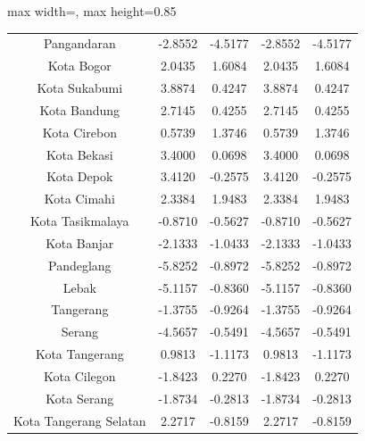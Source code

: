 \begin{table}[H]
\begin{adjustbox}{max width=\textwidth, max height=0.85\textheight}
\begin{tabular}{|c|c|c|c|c|}
Pangandaran & -2.8552 & -4.5177 & -2.8552 & -4.5177 \\
Kota Bogor & 2.0435 & 1.6084 & 2.0435 & 1.6084 \\
Kota Sukabumi & 3.8874 & 0.4247 & 3.8874 & 0.4247 \\
Kota Bandung & 2.7145 & 0.4255 & 2.7145 & 0.4255 \\
Kota Cirebon & 0.5739 & 1.3746 & 0.5739 & 1.3746 \\
Kota Bekasi & 3.4000 & 0.0698 & 3.4000 & 0.0698 \\
Kota Depok & 3.4120 & -0.2575 & 3.4120 & -0.2575 \\
Kota Cimahi & 2.3384 & 1.9483 & 2.3384 & 1.9483 \\
Kota Tasikmalaya & -0.8710 & -0.5627 & -0.8710 & -0.5627 \\
Kota Banjar & -2.1333 & -1.0433 & -2.1333 & -1.0433 \\
Pandeglang & -5.8252 & -0.8972 & -5.8252 & -0.8972 \\
Lebak & -5.1157 & -0.8360 & -5.1157 & -0.8360 \\
Tangerang & -1.3755 & -0.9264 & -1.3755 & -0.9264 \\
Serang & -4.5657 & -0.5491 & -4.5657 & -0.5491 \\
Kota Tangerang & 0.9813 & -1.1173 & 0.9813 & -1.1173 \\
Kota Cilegon & -1.8423 & 0.2270 & -1.8423 & 0.2270 \\
Kota Serang & -1.8734 & -0.2813 & -1.8734 & -0.2813 \\
Kota Tangerang Selatan & 2.2717 & -0.8159 & 2.2717 & -0.8159 \\
\hline
\end{tabular}
\end{adjustbox}
\end{table}
